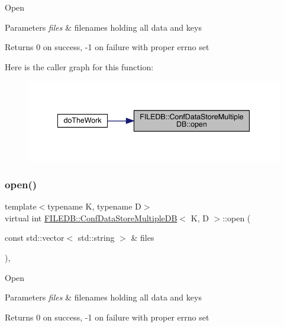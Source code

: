 Open 
\begin{DoxyParams}{Parameters}
{\em files} & filenames holding all data and keys\\
\hline
\end{DoxyParams}
\begin{DoxyReturn}{Returns}
0 on success, -\/1 on failure with proper errno set 
\end{DoxyReturn}
Here is the caller graph for this function\+:\nopagebreak
\begin{figure}[H]
\begin{center}
\leavevmode
\includegraphics[width=341pt]{d3/dc0/classFILEDB_1_1ConfDataStoreMultipleDB_a3370c2f938d91e2352815aa45637b46d_icgraph}
\end{center}
\end{figure}
\mbox{\label{classFILEDB_1_1ConfDataStoreMultipleDB_a3370c2f938d91e2352815aa45637b46d}} 
\subsubsection{\texorpdfstring{open()}{open()}\hspace{0.1cm}{\footnotesize\ttfamily [2/2]}}
{\footnotesize\ttfamily template$<$typename K, typename D$>$ \\
virtual int \mbox{\hyperlink{classFILEDB_1_1ConfDataStoreMultipleDB}{F\+I\+L\+E\+D\+B\+::\+Conf\+Data\+Store\+Multiple\+DB}}$<$ K, D $>$\+::open (\begin{DoxyParamCaption}\item[{const std\+::vector$<$ std\+::string $>$ \&}]{files }\end{DoxyParamCaption})\hspace{0.3cm}{\ttfamily [inline]}, {\ttfamily [virtual]}}

Open 
\begin{DoxyParams}{Parameters}
{\em files} & filenames holding all data and keys\\
\hline
\end{DoxyParams}
\begin{DoxyReturn}{Returns}
0 on success, -\/1 on failure with proper errno set 
\end{DoxyReturn}
\mbox{\label{classFILEDB_1_1ConfDataStoreMultipleDB_a37115269cf1f8f04c49ab888b040fa13}} 
